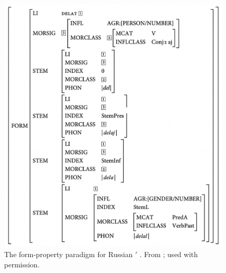 \documentclass[output=paper,hidelinks]{langscibook}
\begin{document}
\begin{figure}[b]
  \centering
  \includegraphics[scale=0.45]{figures/Morphology/Spencer13-263.png}
  \caption{The form-property paradigm for Russian $'$
    . From \citet[263,~(56)]{spencer13}; used with permission.}
  \label{fig:spencer}
\end{figure}
\end{document}
